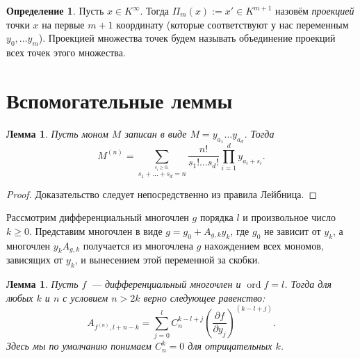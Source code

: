 \documentclass[16pt]{article}
\DeclareMathOperator{\ord}{ord}
\renewcommand{\ge}{\geqslant} %
\theoremstyle{plain1}
\newtheorem{lemma}[theorem1]{Лемма}
\theoremstyle{plain2}
\theoremstyle{plain}
\theoremstyle{plain3}
\theoremstyle{definition}
\newtheorem{definition}[theorem2]{Определение}
\theoremstyle{remark}
\begin{document}
\begin{definition}
Пусть $x\in K^{\infty}$. Тогда $\Pi_m(x):=x'\in K^{m+1}$ назовём \emph{проекцией}
точки $x$ на первые $m+1$ координату (которые соответствуют у нас
переменным $y_0,\ldots y_m$). Проекцией множества точек будем называть объединение проекций всех точек этого множества.
\end{definition}


\section{Вспомогательные леммы}

\begin{lemma}\label{lemma:der_monom}
Пусть моном $M$ записан в виде $M=y_{a_1}\ldots y_{a_d}$. Тогда
$$
M^{(n)} =\sum\limits_{\stackrel{s_i\geqslant0,}{
s_1+\ldots+s_d=n}}\frac{n!}{s_1!\ldots s_d!}
\prod\limits_{i=1}^dy_{a_i+s_i}.
$$
\end{lemma}
\begin{proof}
Доказательство следует непосредственно из правила Лейбница.
\end{proof}
Рассмотрим дифференциальный многочлен $g$ порядка $l$ и произвольное
число $k\ge0$. Представим многочлен в виде $g=g_0+A_{g,k}y_k$, где
$g_0$ не зависит от $y_k$, а многочлен $y_kA_{g,k}$ получается из
многочлена $g$ нахождением всех мономов, зависящих от $y_k$, и
вынесением этой переменной за скобки.


\begin{lemma}\label{lemma:A_fn}
Пусть $f$~--- дифференциальный многочлен и $\ord f = l$.
Тогда для любых $k$ и $n$ с условием $n>2k$ верно следующее
равенство:
$$
A_{f^{(n)}, l + n - k}=\sum\limits_{j=0}^{l}C_n^{k - l + j
}\left(\frac{\partial f}{\partial y_j}\right)^{(k - l + j)}.
$$
Здесь мы по умолчанию понимаем $C_n^{k}=0$ для отрицательных
$k$.
\end{lemma}
\end{document}

